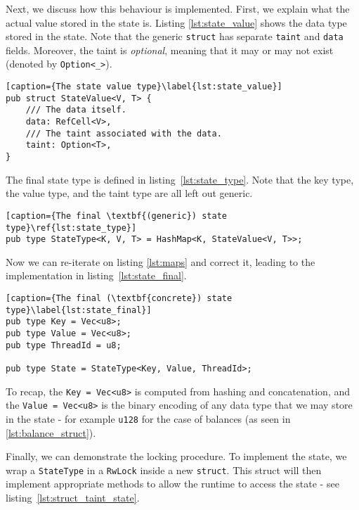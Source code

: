 Next, we discuss how this behaviour is implemented. First, we explain what the actual value stored in the
state is. Listing \ref{lst:state_value} shows the data type stored in the state. Note that the generic \texttt{struct} has
separate \texttt{taint} and \texttt{data} fields. Moreover, the taint is \textit{optional}, meaning
that it may or may not exist (denoted by \texttt{Option<\_>}).

\begin{lstlisting}[caption={The state value type}\label{lst:state_value}]
pub struct StateValue<V, T> {
	/// The data itself.
	data: RefCell<V>,
	/// The taint associated with the data.
	taint: Option<T>,
}
\end{lstlisting}

The final state type is defined in listing~\ref{lst:state_type}. Note that the key type, the value type, and the taint type are all left out generic.

\begin{lstlisting}[caption={The final \textbf{(generic}) state type}\ref{lst:state_type}]
pub type StateType<K, V, T> = HashMap<K, StateValue<V, T>>;
\end{lstlisting}

Now we can re-iterate on listing \ref{lst:maps} and correct it, leading to the implementation in listing~\ref{lst:state_final}.
\begin{lstlisting}[caption={The final (\textbf{concrete}) state type}\label{lst:state_final}]
pub type Key = Vec<u8>;
pub type Value = Vec<u8>;
pub type ThreadId = u8;

pub type State = StateType<Key, Value, ThreadId>;
\end{lstlisting}

To recap, the \texttt{Key = Vec<u8>} is computed from hashing and concatenation, and the
\texttt{Value = Vec<u8>} is the binary encoding of any data type that we may store in the state - for
example \texttt{u128} for the case of balances (as seen in \ref{lst:balance_struct}).

Finally, we can demonstrate the locking procedure. To implement the state, we wrap a
\texttt{StateType} in a \texttt{RwLock} inside a new \texttt{struct}.
This struct will then implement appropriate methods to allow the runtime to access the state - see listing~\ref{lst:struct_taint_state}.

